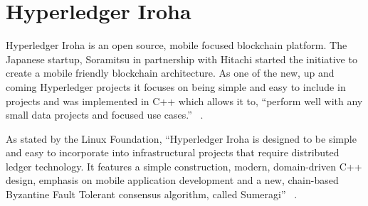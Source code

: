 \section{Hyperledger Iroha}


Hyperledger Iroha is an open source, mobile focused blockchain
platform.  The Japanese startup, Soramitsu in partnership with Hitachi
started the initiative to create a mobile friendly blockchain
architecture. As one of the new, up and coming Hyperledger projects it
focuses on being simple and easy to include in projects and was
implemented in C++ which allows it to, ``perform well with any small
data projects and focused use cases.'' ~\cite{hid-sp18-414-Behlendorf}.

As stated by the Linux Foundation, ``Hyperledger Iroha is designed to
be simple and easy to incorporate into infrastructural projects that
require distributed ledger technology. It features a simple
construction, modern, domain-driven C++ design, emphasis on mobile
application development and a new, chain-based Byzantine Fault
Tolerant consensus algorithm, called 
Sumeragi'' ~\cite{hid-sp18-414-Active_Status_Iroha}.

